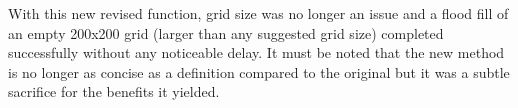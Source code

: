 With this new revised function, grid size was no longer an issue and a flood fill of an empty 200x200 grid (larger than any suggested grid size) completed successfully without any noticeable delay.  It must be noted that the new method is no longer as concise as a definition compared to the original but it was a subtle sacrifice for the benefits it yielded.



